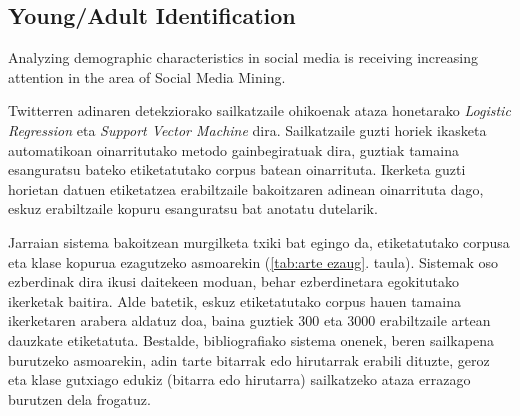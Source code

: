 \documentclass[information,article,submit,moreauthors,pdftex,10pt,a4paper]{Definitions/mdpi}
\begin{document}
\subsection{Young/Adult Identification}\label{sec:identifier_background}

Analyzing demographic characteristics in social media is receiving increasing attention in the area of Social Media Mining.

Twitterren adinaren detekziorako
sailkatzaile ohikoenak ataza honetarako \textit{Logistic Regression} \citep{nguyen2013old,morgan2017predicting} eta \textit{Support Vector Machine} \citep{rao2010classifying,al2012homophily,marquardt2014age} dira. Sailkatzaile guzti horiek ikasketa automatikoan oinarritutako metodo gainbegiratuak dira, guztiak tamaina esanguratsu bateko etiketatutako corpus batean oinarrituta. Ikerketa guzti horietan datuen etiketatzea erabiltzaile bakoitzaren adinean oinarrituta dago, eskuz erabiltzaile kopuru esanguratsu bat anotatu dutelarik.


Jarraian sistema bakoitzean murgilketa txiki bat egingo da, etiketatutako corpusa eta klase kopurua ezagutzeko asmoarekin (\ref{tab:arte ezaug}. taula). Sistemak oso ezberdinak dira ikusi daitekeen moduan, behar ezberdinetara egokitutako ikerketak baitira. Alde batetik, eskuz etiketatutako corpus hauen tamaina ikerketaren arabera aldatuz doa, baina guztiek 300 eta 3000 erabiltzaile artean dauzkate etiketatuta. Bestalde, bibliografiako sistema onenek, beren sailkapena burutzeko asmoarekin, adin tarte bitarrak \citep{rao2010classifying,al2012homophily} edo hirutarrak \citep{nguyen2013old,morgan2017predicting} erabili dituzte, geroz eta klase gutxiago edukiz (bitarra edo hirutarra) sailkatzeko ataza errazago burutzen dela frogatuz.
\end{document}
